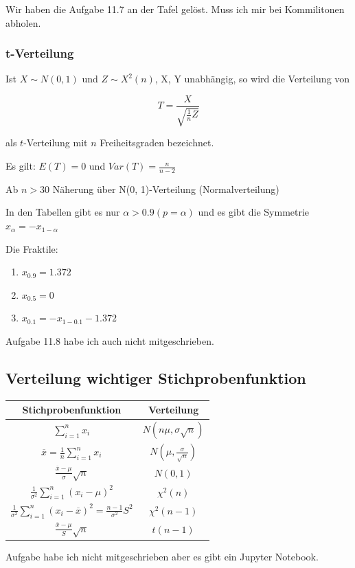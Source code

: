 \documentclass[a4paper]{article}
\begin{document}

Wir haben die Aufgabe 11.7 an der Tafel gelöst. Muss ich mir bei Kommilitonen abholen.

\subsubsection{t-Verteilung}

Ist $X \sim N(0,1)$ und $Z \sim X^2(n)$, X, Y unabhängig, so wird die Verteilung von

\[
T = \frac{X}{\sqrt{\frac{1}{n}Z}}
\]

als $t$-Verteilung mit $n$ Freiheitsgraden bezeichnet.

Es gilt: $E(T)=0$ und $Var(T) = \frac{n}{n-2}$

Ab $n>30$ Näherung über N(0, 1)-Verteilung (Normalverteilung)

In den Tabellen gibt es nur $\alpha > 0.9 (p=\alpha)$ und es gibt die Symmetrie $x_\alpha = -x_{1-\alpha}$

Die Fraktile:

\begin{enumerate}
    \item $x_{0.9} = 1.372$
    \item $x_{0.5} = 0$
    \item $x_{0.1} = -x_{1-0.1} -1.372$
\end{enumerate}

Aufgabe 11.8 habe ich auch nicht mitgeschrieben.

\subsection{Verteilung wichtiger Stichprobenfunktion}

\begin{center}
    \begin{tabular}{c|c}
        Stichprobenfunktion & Verteilung \\
        \hline
        $\sum_{i=1}^{n} x_i$ & $N(n\mu, \sigma \sqrt{n})$ \\
        $\overline{x}=\frac{1}{n}\sum_{i=1}^{n}x_i$ & $N\!\left(\mu, \frac{\sigma}{\sqrt{n}}\right)$ \\
        $\frac{\overline{x}-\mu}{\sigma}\sqrt{n}$ & $N(0,1)$ \\
        $\frac{1}{\sigma^2}\sum_{i=1}^{n}(x_i-\mu)^2$ & $\chi^2(n)$ \\
        $\frac{1}{\sigma^2}\sum_{i=1}^{n}(x_i-\overline{x})^2 = \frac{n-1}{\sigma^2}S^2$ & $\chi^2(n-1)$ \\
        $\frac{\overline{x}-\mu}{S}\sqrt{n}$ & $t(n-1)$ \\
    \end{tabular}
\end{center}

Aufgabe habe ich nicht mitgeschrieben aber es gibt ein Jupyter Notebook.

\end{document}
